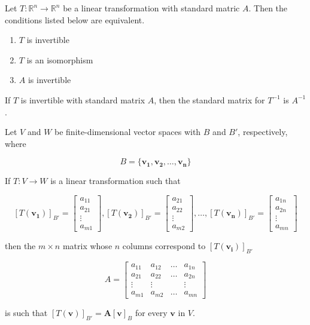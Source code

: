\documentclass{report}
\begin{document}
\begin{tcolorbox}[title = Existence of an Inverse Transformation]
	Let $T: \mathbb{R}^n \to \mathbb{R}^n$ be a linear transformation with standard matric $A$. Then the conditions listed below are equivalent.
	
	\begin{enumerate}
		\item $T$ is invertible
		\item $T$ is an isomorphism
		\item $A$ is invertible
	\end{enumerate}
	
	If $T$ is invertible with standard matrix $A$, then the standard matrix for $T^{-1}$ is $A^{-1}$.
\end{tcolorbox}

\begin{tcolorbox}[title = Transformation Matrix for Nonstandard Bases]
	Let $V$ and $W$ be finite-dimensional vector spaces with $B$ and $B'$, respectively, where 
	
	$$
	B = \{ \bm{v_1}, \bm{v_2}, \hdots, \bm{v_n}\}
	$$
	
	If $T: V \to W$ is a linear transformation such that
	
	$$
	[T(\bm{v_1})]_{B'} = \begin{bmatrix} a_{11} \\ a_{21} \\ \vdots \\ a_{m1} \end{bmatrix}, [T(\bm{v_2})]_{B'} = \begin{bmatrix} a_{21} \\ a_{22} \\ \vdots \\ a_{m2} \end{bmatrix}, \hdots, [T(\bm{v_n})]_{B'} =  \begin{bmatrix} a_{1n} \\ a_{2n} \\ \vdots \\ a_{mn} \end{bmatrix}
	$$
	
	then the $m \times n$ matrix whose $n$ columns correspond to $[T(\bm{v_i})]_{B'}$
	
	$$
	A = 
	\begin{bmatrix} 
		a_{11} & a_{12} & \hdots &a_{1n} \\ a_{21} & a_{22} & \hdots & a_{2n} \\ \vdots & \vdots  & & \vdots \\ a_{m1} & a_{m2} & \hdots & a_{mn}
	\end{bmatrix}
	$$
	
	is such that $[T(\bm{v})]_{B'} = \bm{A} [\bm{v}]_B$ for every $\bm{v}$ in $V$.
\end{tcolorbox}
\end{document}
